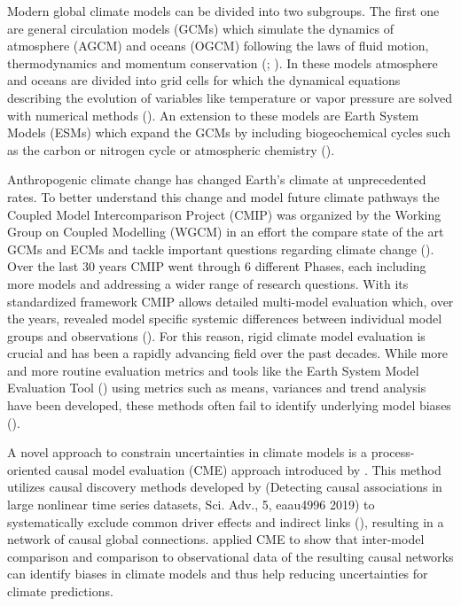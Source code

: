 \documentclass[
]{krantz}
\begin{document}
Modern global climate models can be divided into two subgroups. The first one are general circulation models (GCMs) which simulate the dynamics of atmosphere (AGCM) and oceans (OGCM) following the laws of fluid motion, thermodynamics and momentum conservation (\citet{evaluation2013}; \citet{nowack2020}). In these models atmosphere and oceans are divided into grid cells for which the dynamical equations describing the evolution of variables like temperature or vapor pressure are solved with numerical methods (\citet{climate2008}). An extension to these models are Earth System Models (ESMs) which expand the GCMs by including biogeochemical cycles such as the carbon or nitrogen cycle or atmospheric chemistry (\citet{climate2008}).

Anthropogenic climate change has changed Earth's climate at unprecedented rates. To better understand this change and model future climate pathways the Coupled Model Intercomparison Project (CMIP) was organized by the Working Group on Coupled Modelling (WGCM) in an effort the compare state of the art GCMs and ECMs and tackle important questions regarding climate change (\citep{eyring2016a}). Over the last 30 years CMIP went through 6 different Phases, each including more models and addressing a wider range of research questions. With its standardized framework CMIP allows detailed multi-model evaluation which, over the years, revealed model specific systemic differences between individual model groups and observations (\citep{eyring2019}). For this reason, rigid climate model evaluation is crucial and has been a rapidly advancing field over the past decades. While more and more routine evaluation metrics and tools like the Earth System Model Evaluation Tool (\citep{eyring2016b}) using metrics such as means, variances and trend analysis have been developed, these methods often fail to identify underlying model biases (\citep{nowack2020}).

A novel approach to constrain uncertainties in climate models is a process-oriented causal model evaluation (CME) approach introduced by \citep{nowack2020}. This method utilizes causal discovery methods developed by \citep{runge2019} (Detecting causal associations in large nonlinear time series datasets, Sci. Adv., 5, eaau4996 2019) to systematically exclude common driver effects and indirect links (\citep{nowack2020}), resulting in a network of causal global connections. \citep{nowack2020} applied CME to show that inter-model comparison and comparison to observational data of the resulting causal networks can identify biases in climate models and thus help reducing uncertainties for climate predictions.
\end{document}
